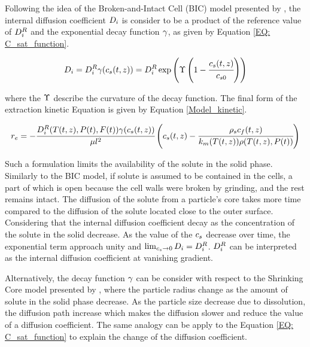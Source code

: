 \documentclass[../Article_Model_Parameters.tex]{subfiles}
\begin{document}
	Following the idea of the Broken-and-Intact Cell (BIC) model presented by \citet{Sovova2017}, the internal diffusion coefficient ${\color{black}D_i}$ is consider to be a product of the reference value of ${\color{black}D_i^R}$ and the exponential decay function ${\color{black} \gamma}$, as given by Equation \ref{EQ: C_sat_function}.
		
	{\footnotesize
		\begin{equation}
			{\color{black}D_i} = {\color{black}D_i^R} {\color{black} \gamma}({\color{black} c_s} (t,z)) = {\color{black}D_i^R} \exp\left( {\color{black}\Upsilon} \left( 1-\cfrac{{\color{black} c_s} (t,z) }{{\color{black}c_{s0}}} \right) \right) \label{EQ: C_sat_function}
		\end{equation} }
	
	where the ${\color{black}\Upsilon}$ describe the curvature of the decay function. The final form of the extraction kinetic Equation is given by Equation \ref{Model_kinetic}.
			
	{\scriptsize
		\begin{equation}
			\label{Model_kinetic}
				r_e = -\cfrac{{\color{black}D_i^R}(T(t,z), {\color{black}P}(t), F(t)) {\color{black} \gamma}({\color{black} c_s} (t,z)) }{{\color{black} \mu l^2} } \left({\color{black}{\color{black} c_s} }(t,z)  - \cfrac{{\color{black}\rho_s}c_f(t,z)}{{\color{black}k_m}(T(t,z)){\color{black}\rho}(T(t,z),{\color{black}P}(t))}  \right)
		\end{equation} }
	
	Such a formulation limits the availability of the solute in the solid phase. Similarly to the BIC model, if solute is assumed to be contained in the cells, a part of which is open because the cell walls were broken by grinding, and the rest remains intact. The diffusion of the solute from a particle's core takes more time compared to the diffusion of the solute located close to the outer surface. Considering that the internal diffusion coefficient decay as the concentration of the solute in the solid decrease. As the value of the ${\color{black}c_s}$ decrease over time, the exponential term approach unity and $\lim_{ {\color{black}c_s} \rightarrow 0} {\color{black}D_i} =  {\color{black}D_i^R}$. ${\color{black}D_i^R}$ can be interpreted as the internal diffusion coefficient at vanishing gradient. 
		
	Alternatively, the decay function ${\color{black}\gamma}$ can be consider with respect to the Shrinking Core model presented by \citet{Goto1996}, where the particle radius change as the amount of solute in the solid phase decrease. As the particle size decrease due to dissolution, the diffusion path increase which makes the diffusion slower and reduce the value of a diffusion coefficient. The same analogy can be apply to the Equation \ref{EQ: C_sat_function} to explain the change of the diffusion coefficient.
		
\end{document}
